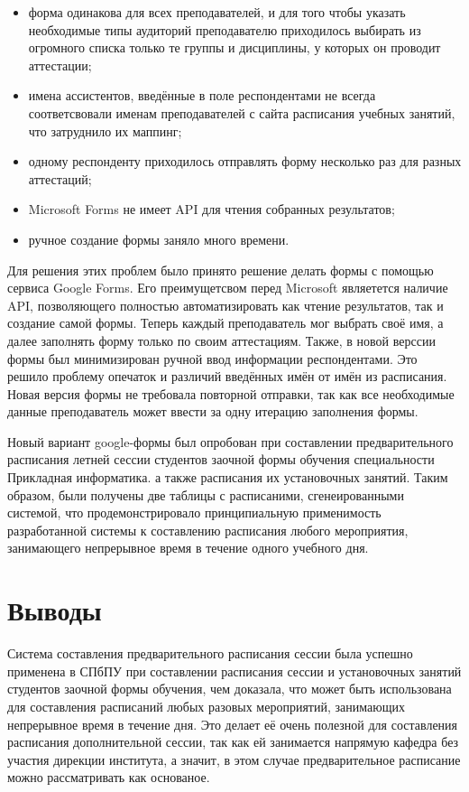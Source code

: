 \begin{itemize}
	\item форма одинакова для всех преподавателей, и для того чтобы указать необходимые типы аудиторий преподавателю приходилось выбирать из огромного списка только те группы и дисциплины, у которых он проводит аттестации;
	\item имена ассистентов, введённые в поле респондентами не всегда соответсвовали именам преподавателей с сайта расписания учебных занятий, что затруднило их маппинг;
	\item одному респонденту приходилось отправлять форму несколько раз для разных аттестаций;
	\item Microsoft Forms не имеет API для чтения собранных результатов;
	\item ручное создание формы заняло много времени.
\end{itemize} 	

Для решения этих проблем было принято решение делать формы с помощью сервиса Google Forms. Его преимущетсвом перед Microsoft являетется наличие API, позволяющего полностью автоматизировать как чтение результатов, так и создание самой формы. Теперь каждый преподаватель мог выбрать своё имя, а далее заполнять форму только по своим аттестациям. Также, в новой верссии формы был минимизирован ручной ввод информации респондентами. Это решило проблему опечаток и различий введённых имён от имён из расписания. Новая версия формы не требовала повторной отправки, так как все необходимые данные преподаватель может ввести за одну итерацию заполнения формы.

Новый вариант google-формы был опробован при составлении предварительного расписания летней сессии студентов заочной формы обучения специальности Прикладная информатика. 
а также расписания их установочных занятий. Таким образом, были получены две таблицы с расписаними, сгенеированными системой, что продемонстрировало принципиальную применимость разработанной системы к составлению расписания любого мероприятия, занимающего непрерывное время в течение одного учебного дня. 

\section{Выводы} \label{ch4:conclusion}

Система составления предварительного расписания сессии была успешно применена в СПбПУ при составлении расписания сессии и установочных занятий студентов заочной формы обучения, чем доказала, что может быть использована для составления расписаний любых разовых мероприятий, занимающих непрерывное время в течение дня. Это делает её очень полезной для составления расписания дополнительной сессии, так как ей занимается напрямую кафедра без участия дирекции института, а значит, в этом случае предварительное расписание можно рассматривать как основаное.

